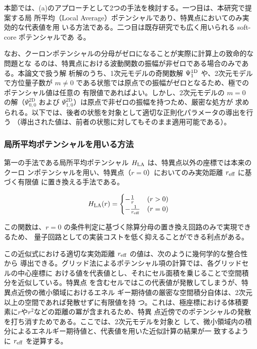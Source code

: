 \documentclass[wabun2025.tex]{subfiles}
\begin{document}
本節では、(a)のアプローチとして2つの手法を検討する。一つ目は、本研究で提案する局
所平均（Local Average）ポテンシャルであり、特異点においてのみ実効的な代表値を用
いる方法である。二つ目は既存研究でも広く用いられる soft-core ポテンシャルであ
る。

なお、クーロンポテンシャルの分母がゼロになることが実際に計算上の致命的な問題とな
るのは、特異点における波動関数の振幅が非ゼロである場合のみである。本論文で扱う解
析解のうち、1次元モデルの奇関数解 $\Psi^{\mathrm{1D}}_1$ や、2次元モデルで方位量子数が $m
\neq 0$ である状態では原点での振幅がゼロとなるため、極でのポテンシャル値は任意の
有限値であればよい。しかし、2次元モデルの $m=0$ の解（$\Psi_{0,0}^{\mathrm{2D}}$
および $\Psi_{1,0}^{\mathrm{2D}}$）は原点で非ゼロの振幅を持つため、厳密な処方が
求められる。以下では、後者の状態を対象として適切な正則化パラメータの導出を行う
（導出された値は、前者の状態に対してもそのまま適用可能である）。

\subsubsection{局所平均ポテンシャルを用いる方法}

第一の手法である局所平均ポテンシャル $H_{\mathrm{LA}}$ は、特異点以外の座標では本来のクーロ
ンポテンシャルを用い、特異点（$r=0$）においてのみ実効距離 $r_{\mathrm{eff}}$ に基づく有限値
に置き換える手法である。

\begin{equation}
H_{\mathrm{LA}}(r) = \begin{cases}
-\frac{1}{r} & (r>0) \\
-\frac{1}{r_{\mathrm{eff}}} & (r=0)
\end{cases}\label{eq:Halr}
\end{equation}

この関数は、$r=0$ の条件判定に基づく除算分母の置き換え回路のみで実現できるため、
量子回路としての実装コストを低く抑えることができる利点がある。

この近似式における適切な実効距離 $r_{\mathrm{eff}}$ の値は、次のように幾何学的な整合性から
導出できる。グリッド法によるポテンシャル項の計算では、各グリッドセルの中心座標に
おける値を代表値とし、それにセル面積を乗じることで空間積分を近似している。特異点
を含むセルではこの代表値が発散してしまうが、特異点近傍の微小領域におけるエネル
ギー期待値の厳密な空間積分自体は、2次元以上の空間であれば発散せずに有限値を持
つ。これは、極座標における体積要素に$r$や$r^2$などの距離の冪が含まれるため、特異
点近傍でのポテンシャルの発散を打ち消すためである。ここでは、2次元モデルを対象と
して、微小領域内の積分によるエネルギー期待値と、代表値を用いた近似計算の結果が一
致するように $r_{\mathrm{eff}}$ を逆算する。
\end{document}
